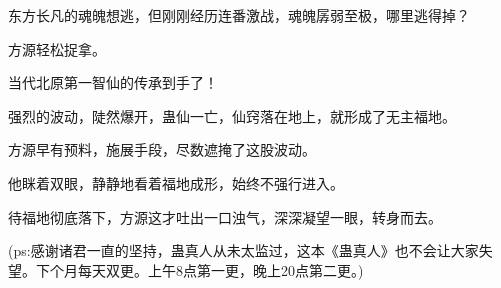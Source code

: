 \begin{this_body}
东方长凡的魂魄想逃，但刚刚经历连番激战，魂魄孱弱至极，哪里逃得掉？

方源轻松捉拿。

当代北原第一智仙的传承到手了！

强烈的波动，陡然爆开，蛊仙一亡，仙窍落在地上，就形成了无主福地。

方源早有预料，施展手段，尽数遮掩了这股波动。

他眯着双眼，静静地看着福地成形，始终不强行进入。

待福地彻底落下，方源这才吐出一口浊气，深深凝望一眼，转身而去。

(ps:感谢诸君一直的坚持，蛊真人从未太监过，这本《蛊真人》也不会让大家失望。下个月每天双更。上午8点第一更，晚上20点第二更。)

\end{this_body}

